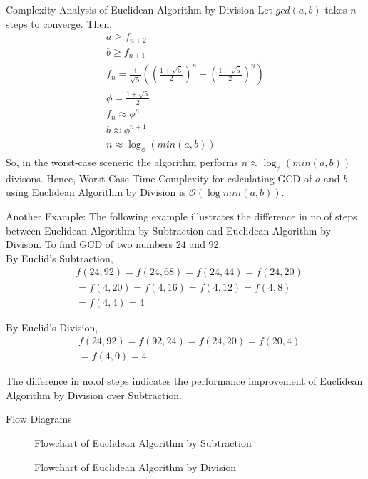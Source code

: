 \documentclass[8pt]{beamer}
\begin{document}
\begin{frame}[allowframebreaks]{Complexity Analysis of Euclidean Algorithm by Division}
Let $gcd(a,b)$ takes $n$ steps to converge. Then,
\begin{align}
a \geq f_{n+2}\\
b \geq f_{n+1}\\
f_{n}=\frac{1}{\sqrt{5}}\left(\left(\frac{1+\sqrt{5}}{2}\right)^{n}-\left(\frac{1-\sqrt{5}}{2}\right)^{n}\right)\\
\phi = \frac{1+\sqrt{5}}{2}\\
f_{n} \approx \phi^{n}\\
b \approx \phi^{n+1}\\
n \approx \log_{\phi}{\left(min(a,b)\right)}
\end{align}
So, in the worst-case scenerio the algorithm performs $n \approx \log_{\phi}{\left(min(a,b)\right)} $ divisons. Hence, Worst Case Time-Complexity for calculating GCD of $a$ and  $b$ using Euclidean Algorithm by Division is $\mathcal{O}(\log min(a,b))$.\\

\end{frame}

\begin{frame}{Another Example:}
The following example illustrates the difference in no.of steps between Euclidean Algorithm by Subtraction and Euclidean Algorithm by Divison. To find GCD of two numbers $24$ and $92$.\\

By Euclid's Subtraction,
\[
\begin{split}
&f(24,92) = f(24,68) = f(24,44) = f(24,20)\\
&= f(4,20) = f(4,16) = f(4,12) = f(4,8)\\
&= f(4,4) = 4
\end{split}\]

By Euclid's Division,
\[
\begin{split}
&f(24,92) = f(92,24) = f(24,20) = f(20,4)\\
&= f(4,0) = 4
\end{split}\]

The difference in no.of steps indicates the performance improvement of Euclidean Algorithm by Division over Subtraction.
\end{frame}

\begin{frame}[allowframebreaks]{Flow Diagrams}
\begin{figure}[h!]
	\begin{center}
		\resizebox{4.25cm}{!}{}
	\end{center}
	\caption{Flowchart of Euclidean Algorithm by Subtraction}
	\label{fig:Input}
\end{figure}
\begin{figure}[h!]
	\begin{center}
		\resizebox{4.25cm}{!}{}
	\end{center}
	\caption{Flowchart of Euclidean Algorithm by Division}
	\label{fig:Input}
\end{figure}
\end{frame}
\end{document}
